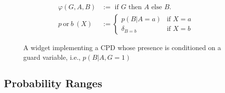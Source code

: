 \begin{figure}
    \hspace{1cm}
	\begin{minipage}{0.3\textwidth}
		\begin{align*}
			\varphi(G,A,B) &:= \text{ if } G \text{ then } A \text{ else } B. \\[1em]
			p \mathrm{~or~} b~(X) &:= \begin{cases}
				p(B|A\!=\!a) & \text{if } X = a \\
				\delta_{B=b} & \text{if } X = b 
			\end{cases}
		\end{align*}
	\end{minipage}
    \caption{A widget implementing a CPD whose presence is conditioned on a guard variable, i.e., $p(B|A,G{=}1)$}
        \label{fig:guard-variable}
\end{figure}

\subsection{Probability Ranges}


